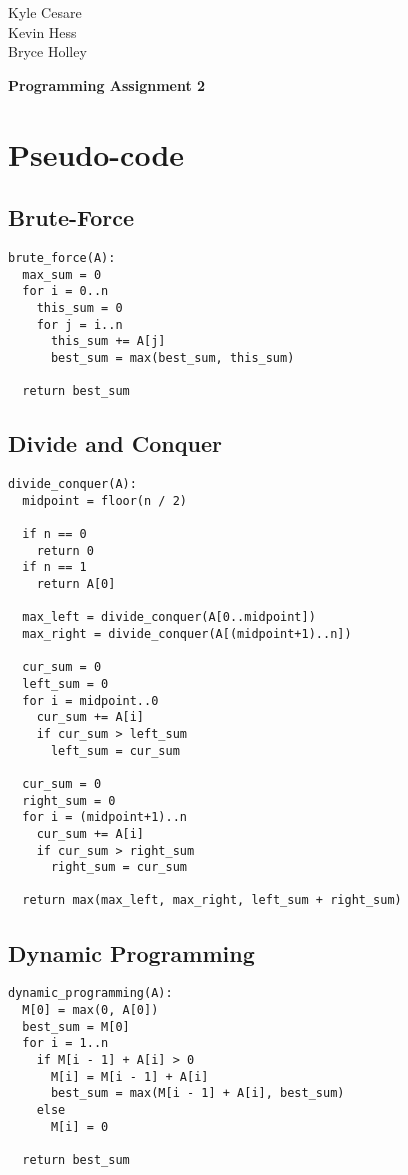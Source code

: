 \documentclass[12pt,letterpaper]{article}
\begin{document}
\begin{flushright}
Kyle Cesare \\
Kevin Hess \\
Bryce Holley
\end{flushright}

{\center\textbf{Programming Assignment 2} \\}

\section{Pseudo-code}

\subsection{Brute-Force}

\begin{verbatim}
brute_force(A):
  max_sum = 0
  for i = 0..n
    this_sum = 0
    for j = i..n
      this_sum += A[j]
      best_sum = max(best_sum, this_sum)

  return best_sum
\end{verbatim}

\subsection{Divide and Conquer}

\begin{verbatim}
divide_conquer(A):
  midpoint = floor(n / 2)

  if n == 0
    return 0
  if n == 1
    return A[0]

  max_left = divide_conquer(A[0..midpoint])
  max_right = divide_conquer(A[(midpoint+1)..n])

  cur_sum = 0
  left_sum = 0
  for i = midpoint..0
    cur_sum += A[i]
    if cur_sum > left_sum
      left_sum = cur_sum

  cur_sum = 0
  right_sum = 0
  for i = (midpoint+1)..n
    cur_sum += A[i]
    if cur_sum > right_sum
      right_sum = cur_sum

  return max(max_left, max_right, left_sum + right_sum)
\end{verbatim}

\subsection{Dynamic Programming}
    
\begin{verbatim}
dynamic_programming(A):
  M[0] = max(0, A[0])
  best_sum = M[0]
  for i = 1..n
    if M[i - 1] + A[i] > 0
      M[i] = M[i - 1] + A[i]
      best_sum = max(M[i - 1] + A[i], best_sum)
    else
      M[i] = 0

  return best_sum
\end{verbatim}
\end{document}
